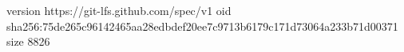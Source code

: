 version https://git-lfs.github.com/spec/v1
oid sha256:75de265c96142465aa28edbdef20ee7c9713b6179c171d73064a233b71d00371
size 8826
